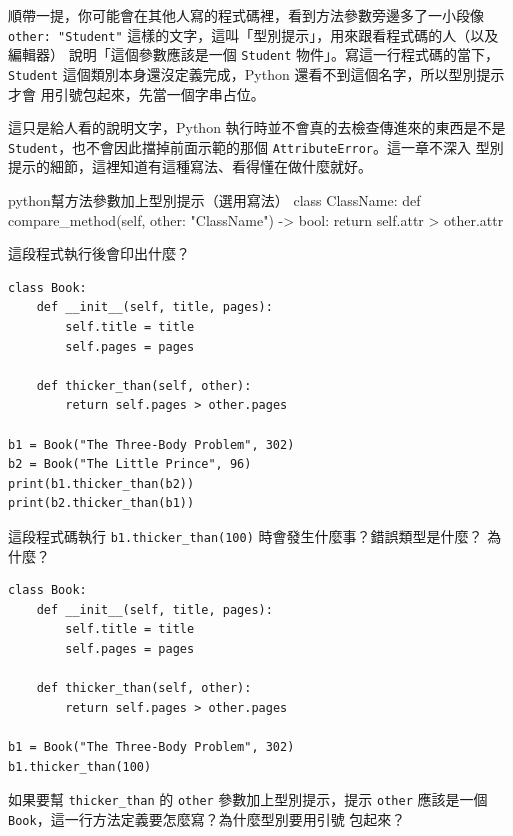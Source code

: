 
順帶一提，你可能會在其他人寫的程式碼裡，看到方法參數旁邊多了一小段像
\texttt{other: "Student"} 這樣的文字，這叫「型別提示」，用來跟看程式碼的人（以及編輯器）
說明「這個參數應該是一個 \texttt{Student} 物件」。寫這一行程式碼的當下，
\texttt{Student} 這個類別本身還沒定義完成，Python 還看不到這個名字，所以型別提示才會
用引號包起來，先當一個字串占位。

這只是給人看的說明文字，Python 執行時並不會真的去檢查傳進來的東西是不是
\texttt{Student}，也不會因此擋掉前面示範的那個 \texttt{AttributeError}。這一章不深入
型別提示的細節，這裡知道有這種寫法、看得懂在做什麼就好。

\begin{code}{python}{幫方法參數加上型別提示（選用寫法）}
class ClassName:
    def compare_method(self, other: "ClassName") -> bool:
        return self.attr > other.attr
\end{code}

\begin{drills}[label=drills:comparing-instances]
\item 這段程式執行後會印出什麼？
\begin{verbatim}
class Book:
    def __init__(self, title, pages):
        self.title = title
        self.pages = pages

    def thicker_than(self, other):
        return self.pages > other.pages

b1 = Book("The Three-Body Problem", 302)
b2 = Book("The Little Prince", 96)
print(b1.thicker_than(b2))
print(b2.thicker_than(b1))
\end{verbatim}
\item 這段程式碼執行 \texttt{b1.thicker\_than(100)} 時會發生什麼事？錯誤類型是什麼？
為什麼？
\begin{verbatim}
class Book:
    def __init__(self, title, pages):
        self.title = title
        self.pages = pages

    def thicker_than(self, other):
        return self.pages > other.pages

b1 = Book("The Three-Body Problem", 302)
b1.thicker_than(100)
\end{verbatim}
\item 如果要幫 \texttt{thicker\_than} 的 \texttt{other} 參數加上型別提示，提示
\texttt{other} 應該是一個 \texttt{Book}，這一行方法定義要怎麼寫？為什麼型別要用引號
包起來？
\end{drills}

